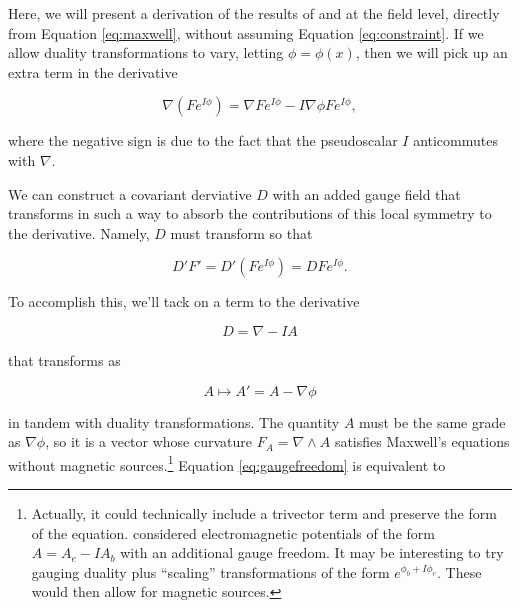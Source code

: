 \documentclass{article}
\begin{document}
  Here, we will present a derivation of the results of \cite{tiwari} and \cite{vasconcellos} at the field level, directly from Equation \ref{eq:maxwell}, without assuming Equation \ref{eq:constraint}. If we allow duality transformations to vary, letting $\phi = \phi(x)$, then we will pick up an extra term in the derivative

  \begin{equation}
    \nabla (F e^{I \phi}) = \nabla F e^{I \phi} - I \nabla \phi F e^{I\phi},
  \end{equation}

  where the negative sign is due to the fact that the pseudoscalar $I$ anticommutes with $\nabla$.

  We can construct a covariant derviative $D$ with an added gauge field that transforms in such a way to absorb the contributions of this local symmetry to the derivative. Namely, $D$ must transform so that

  \begin{equation}
    D' F' = D' (F e^{I \phi}) = D F e^{I \phi}. \label{eq:covariant}
  \end{equation}


  To accomplish this, we'll tack on a term to the derivative

  \begin{equation}
    D = \nabla - I A
  \end{equation}

  that transforms as

  \begin{equation}
    A \mapsto A' = A - \nabla \phi\label{eq:gaugefreedom}
  \end{equation}

  in tandem with duality transformations. The quantity $A$ must be the same grade as $\nabla \phi$, so it is a vector whose curvature $F_A = \nabla \wedge A$ satisfies Maxwell's equations without magnetic sources.\footnote{Actually, it could technically include a trivector term and preserve the form of the equation. \cite{dressel} considered electromagnetic potentials of the form $A = A_e - I A_b$ with an additional gauge freedom. It may be interesting to try gauging duality plus ``scaling'' transformations of the form $e^{\phi_b + I \phi_e}$. These would then allow for magnetic sources.} Equation \ref{eq:gaugefreedom} is equivalent to
\end{document}
